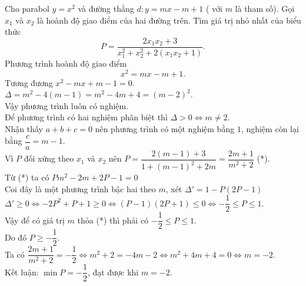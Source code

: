 \begin{bt}%
	Cho parabol $y=x^2$ và đường thẳng $d\colon y=mx-m+1$ ( với $m$ là tham số). Gọi $x_1$ và $x_2$ là hoành độ giao điểm của hai đường trên. Tìm giá trị nhỏ nhất của biểu thức $$P= \dfrac{2x_1x_2+3}{x_1^2+x_2^2+2(x_1x_2+1)}.$$
	\loigiai
	{ 
		Phương trình hoành độ giao điểm
		$$x^2 = mx - m + 1 .$$
		Tương đương $x^2 - mx + m - 1 = 0$.\\
		$\Delta = m^2 - 4(m-1) = m^2 - 4m + 4 = (m-2)^2$.\\
		Vậy phương trình luôn có nghiệm.\\
		Để phương trình có hai nghiệm phân biệt thì $\Delta > 0 \Leftrightarrow m \ne 2$.\\
		Nhận thấy $a + b + c = 0$ nên phương trình có một nghiệm bằng $1$, nghiệm còn lại bằng $\dfrac{c}{a} = m - 1$.\\
		Vì $P$ đối xứng theo $x_1$ và $x_2$ nên $P = \dfrac{2(m-1)+ 3}{1 + (m-1)^2 + 2m} = \dfrac{2m + 1}{m^2 + 2}$ (*).\\
		Từ (*) ta có $Pm^2 - 2m + 2P - 1 = 0$\\
		Coi đây là một phương trình bậc hai theo $m$, xét $\Delta' = 1 - P(2P-1)$\\
		$\Delta' \ge 0 \Leftrightarrow -2P^2 + P + 1 \ge 0 \Leftrightarrow (P-1)(2P+1) \le 0 \Leftrightarrow -\dfrac{1}{2} \le P \le 1$.\\
		Vậy để có giá trị $m$ thỏa (*) thì phải có $-\dfrac{1}{2} \le P \le 1$.\\
		Do đó $P \ge -\dfrac{1}{2}$.\\
		Ta có $\dfrac{2m + 1}{m^2 + 2} = -\dfrac{1}{2} \Leftrightarrow m^2 + 2 = -4m - 2 \Leftrightarrow m^2 + 4m + 4 = 0 \Leftrightarrow m = -2$.\\
		Kết luận: $\min P = -\dfrac{1}{2}$, đạt được khi $m = -2$.\\
	}
\end{bt}


